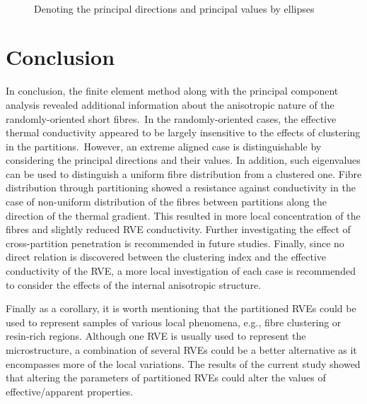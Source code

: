 	\begin{figure}[!h]
	\centering
	
	\hspace{0.15\textwidth}
	\\
	\hspace{0.15\textwidth}
	\caption{Denoting the principal directions and principal values by ellipses}\label{fig:ellip}
	\end{figure}
	
	\section{Conclusion}
	In conclusion, the finite element method along with the principal component analysis revealed additional information about the anisotropic nature of the randomly-oriented short fibres.\red~In the randomly-oriented cases, the effective thermal conductivity appeared to be largely insensitive to the effects of clustering in the partitions.\bl~However, an extreme aligned case is distinguishable by considering the principal directions and their values. In addition, such eigenvalues can be used to distinguish a uniform fibre distribution from a clustered one. Fibre distribution through partitioning showed a resistance against conductivity in the case of non-uniform distribution of the fibres between partitions along the direction of the thermal gradient. This resulted in more local concentration of the fibres and slightly reduced RVE conductivity. Further investigating the effect of cross-partition penetration is recommended in future studies. Finally, since no direct relation is discovered between the clustering index and the effective conductivity of the RVE, a more local investigation of each case is recommended to consider the effects of the internal anisotropic structure.
	
	\red
	Finally as a corollary, it is worth mentioning that the partitioned RVEs could be used to represent samples of various local phenomena, e.g., fibre clustering or resin-rich regions. Although one RVE is usually used to represent the microstructure, a combination of several RVEs could be a better alternative as it encompasses more of the local variations. The results of the current study showed that altering the parameters of partitioned RVEs could alter the values of effective/apparent properties.
	\bl
	


